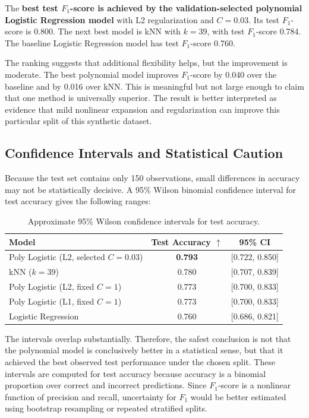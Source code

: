 \documentclass[12pt]{article}
\newcommand{\best}[1]{\textbf{#1}}
\begin{document}
The \textbf{best test $F_1$-score is achieved by the validation-selected polynomial Logistic Regression model} with L2 regularization and $C=0.03$. Its test $F_1$-score is 0.800. The next best model is kNN with $k=39$, with test $F_1$-score 0.784. The baseline Logistic Regression model has test $F_1$-score 0.760.

The ranking suggests that additional flexibility helps, but the improvement is moderate. The best polynomial model improves $F_1$-score by 0.040 over the baseline and by 0.016 over kNN. This is meaningful but not large enough to claim that one method is universally superior. The result is better interpreted as evidence that mild nonlinear expansion and regularization can improve this particular split of this synthetic dataset.

\subsection{Confidence Intervals and Statistical Caution}

Because the test set contains only 150 observations, small differences in accuracy may not be statistically decisive. A 95\% Wilson binomial confidence interval for test accuracy gives the following ranges:

\begin{table}[htbp]
\centering
\caption{Approximate 95\% Wilson confidence intervals for test accuracy.}
\begin{tabular}{lcc}
\toprule
Model & Test Accuracy $\uparrow$ & 95\% CI \\
\midrule
Poly Logistic (L2, selected $C=0.03$) & \best{0.793} & [0.722, 0.850] \\
kNN ($k=39$) & 0.780 & [0.707, 0.839] \\
Poly Logistic (L2, fixed $C=1$) & 0.773 & [0.700, 0.833] \\
Poly Logistic (L1, fixed $C=1$) & 0.773 & [0.700, 0.833] \\
Logistic Regression & 0.760 & [0.686, 0.821] \\
\bottomrule
\end{tabular}
\end{table}

The intervals overlap substantially. Therefore, the safest conclusion is not that the polynomial model is conclusively better in a statistical sense, but that it achieved the best observed test performance under the chosen split. These intervals are computed for test accuracy because accuracy is a binomial proportion over correct and incorrect predictions. Since $F_1$-score is a nonlinear function of precision and recall, uncertainty for $F_1$ would be better estimated using bootstrap resampling or repeated stratified splits.
\end{document}
